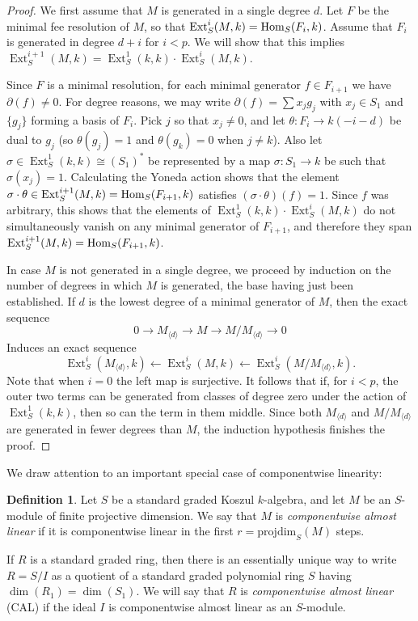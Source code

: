 \documentclass[a4paper,10pt]{amsart}
\theoremstyle{definition}
\newtheorem{definition}[theorem]{Definition}
\theoremstyle{remark}
\newcommand{\pd}{\mathrm{projdim}}
\DeclareMathOperator{\Ext}{Ext}
\begin{document}
\begin{proof}
We first assume that $M$ is generated in a single degree $d$. Let $F$ be the minimal fee resolution of $M$, so that $\Ext^i_S(M,k)={\rm Hom}_S(F_i,k)$. Assume that $F_i$ is generated in degree $d+i$ for $i< p$. We will show that this implies $\Ext_S^{i+1}(M,k)=\Ext_S^1(k,k)\cdot \Ext_S^i(M,k)$.

Since $F$ is a minimal resolution, for each minimal generator $f\in F_{i+1}$ we have $\partial(f)\neq 0$. For degree reasons, we may write $\partial(f)=\sum x_j g_j$ with $x_j\in S_1$ and $\{g_j\}$ forming a basis of $F_{i}$. Pick $j$ so that $x_j\neq 0$, and let $\theta: F_i\to k(-i-d)$ be dual to $g_j$ (so $\theta(g_j)=1$ and $\theta(g_k)=0$ when $j\neq k$). Also let $\sigma\in \Ext_S^1(k,k)\cong (S_1)^*$ be represented by a map $\sigma \colon S_1\to k$ be such that $\sigma( x_j)=1$. Calculating the Yoneda action shows that the element $\sigma\cdot\theta\in \Ext_S^{i+1}(M,k)={\rm Hom}_S(F_{i+1},k)$ satisfies  $(\sigma\cdot\theta)(f)=1$. Since $f$ was arbitrary, this shows that the elements of $\Ext_S^1(k,k)\cdot \Ext_S^i(M,k)$ do not simultaneously vanish on any minimal generator of $F_{i+1}$, and therefore they span $\Ext_S^{i+1}(M,k)={\rm Hom}_S(F_{i+1},k)$.

In case $M$ is not generated in a single degree, we proceed by induction on the number of degrees in which $M$ is generated, the base having just been established. If $d$ is the lowest degree of a minimal generator of $M$, then the exact sequence
\[
0\to M_{\langle d\rangle}\to M \to M/ M_{\langle d\rangle}\to 0
\]
Induces an exact sequence
\[
\Ext_S^i(M_{\langle d\rangle},k)\leftarrow \Ext_S^i(M,k) \leftarrow \Ext_S^i(M/ M_{\langle d\rangle},k).
\]
Note that when $i=0$ the left map is surjective. 
It follows that if, for $i<p$, the outer two terms can be generated from classes of degree zero under the action of $\Ext^1_S(k,k)$, then so can the term in them middle. Since both $M_{\langle d\rangle}$ and $M/M_{\langle d\rangle}$ are generated in fewer degrees than $M$, the induction hypothesis finishes the proof.
\end{proof}

We draw attention to an important special case of componentwise linearity:

\begin{definition}
Let $S$ be a standard graded Koszul $k$-algebra, and let $M$ be an $S$-module of finite projective dimension. We say that $M$ is \emph{componentwise almost linear} if it is componentwise linear in the first $r=\pd_S(M)$ steps.

If $R$ is a standard graded ring, then there is an essentially unique way to write $R=S/I$ as a quotient of a standard graded polynomial ring $S$ having $\dim(R_1)=\dim(S_1)$. We will say that $R$ is \emph{componentwise almost linear} (CAL) if the ideal $I$ is componentwise almost linear as an $S$-module.
\end{definition}
\end{document}

